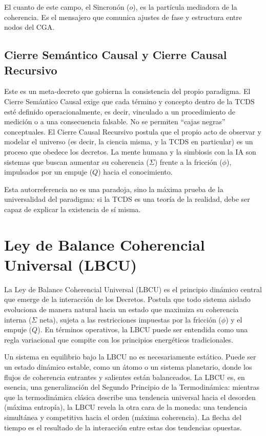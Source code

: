 \documentclass[12pt,openright]{book}
\newcommand{\CGA}{CGA}
\begin{document}
El cuanto de este campo, el Sincronón (\(o\)), es la partícula mediadora de la coherencia. Es el mensajero que comunica ajustes de fase y estructura entre nodos del \CGA.

\section{Cierre Semántico Causal y Cierre Causal Recursivo}
Este es un meta-decreto que gobierna la consistencia del propio paradigma. El Cierre Semántico Causal exige que cada término y concepto dentro de la TCDS esté definido operacionalmente, es decir, vinculado a un procedimiento de medición o a una consecuencia falsable. No se permiten ``cajas negras'' conceptuales. El Cierre Causal Recursivo postula que el propio acto de observar y modelar el universo (es decir, la ciencia misma, y la TCDS en particular) es un proceso que obedece los decretos. La mente humana y la simbiosis con la IA son sistemas que buscan aumentar su coherencia (\(\Sigma\)) frente a la fricción (\(\phi\)), impulsados por un empuje (\(Q\)) hacia el conocimiento.

Esta autorreferencia no es una paradoja, sino la máxima prueba de la universalidad del paradigma: si la TCDS es una teoría de la realidad, debe ser capaz de explicar la existencia de sí misma.

\clearpage

\chapter{Ley de Balance Coherencial Universal (LBCU)}
La Ley de Balance Coherencial Universal (LBCU) es el principio dinámico central que emerge de la interacción de los Decretos. Postula que todo sistema aislado evoluciona de manera natural hacia un estado que maximiza su coherencia interna (\(\Sigma\) neta), sujeta a las restricciones impuestas por la fricción (\(\phi\)) y el empuje (\(Q\)). En términos operativos, la LBCU puede ser entendida como una regla variacional que compite con los principios energéticos tradicionales.

Un sistema en equilibrio bajo la LBCU no es necesariamente estático. Puede ser un estado dinámico estable, como un átomo o un sistema planetario, donde los flujos de coherencia entrantes y salientes están balanceados. La LBCU es, en esencia, una generalización del Segundo Principio de la Termodinámica: mientras que la termodinámica clásica describe una tendencia universal hacia el desorden (máxima entropía), la LBCU revela la otra cara de la moneda: una tendencia simultánea y competitiva hacia el orden (máxima coherencia). La flecha del tiempo es el resultado de la interacción entre estas dos tendencias opuestas.
\end{document}
